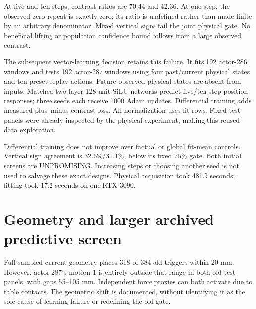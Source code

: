 \documentclass[10pt]{article}
\begin{document}
\begin{table}[h]
\centering

\caption{Initial fixed panels: pulse versus observed zero-repeat position contrasts.}
\end{table}

At five and ten steps, contrast ratios are 70.44 and 42.36. At one step, the observed
zero repeat is exactly zero; its ratio is undefined rather than made finite by an
arbitrary denominator. Mixed vertical signs fail the joint physical gate. No beneficial
lifting or population confidence bound follows from a large observed contrast.

The subsequent vector-learning decision retains this failure. It fits 192 actor-286
windows and tests 192 actor-287 windows using four past/current physical states and
ten preset replay actions. Future observed physical states are absent from inputs.
Matched two-layer 128-unit SiLU networks predict five/ten-step position responses;
three seeds each receive 1000 Adam updates. Differential training adds measured
plus--minus contrast loss. All normalization uses fit rows. Fixed test panels were
already inspected by the physical experiment, making this reused-data exploration.

\begin{table}[h]
\centering

\caption{Actor-transfer contrast RMSE, millimeters; learned rows average three optimization seeds.}
\end{table}

Differential training does not improve over factual or global fit-mean controls.
Vertical sign agreement is 32.6\%/31.1\%, below its fixed 75\% gate. Both initial
screens are UNPROMISING. Increasing steps or choosing another seed is not used to
salvage these exact designs. Physical acquisition took 481.9 seconds; fitting took
17.2 seconds on one RTX 3090.

\section{Geometry and larger archived predictive screen}
Full sampled current geometry places 318 of 384 old triggers within 20 mm. However,
actor 287's motion 1 is entirely outside that range in both old test panels, with
gaps 55--105 mm. Independent force proxies can both activate due to table contacts.
The geometric shift is documented, without identifying it as the sole cause of
learning failure or redefining the old gate.
\end{document}
